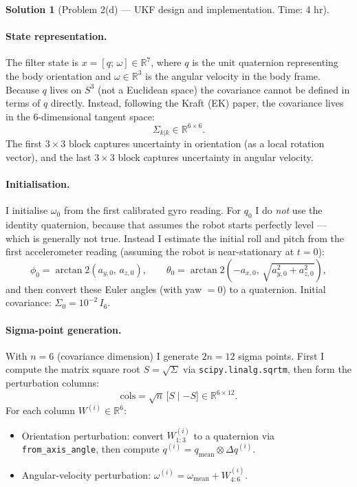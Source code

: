 \documentclass[11pt, reqno, letterpaper]{amsart}
\theoremstyle{plain}
\theoremstyle{definition}
\newtheorem{solution}[theorem]{Solution}
\begin{document}
\clearpage
\begin{solution}[Problem 2(d) — UKF design and implementation. Time: 4 hr]

\paragraph{State representation.}
The filter state is $x=[q;\,\omega]\in\mathbb{R}^7$, where $q$ is the
unit quaternion representing the body orientation and
$\omega\in\mathbb{R}^3$ is the angular velocity in the body frame.
Because $q$ lives on $S^3$ (not a Euclidean space) the covariance cannot
be defined in terms of $q$ directly.  Instead, following the Kraft (EK)
paper, the covariance lives in the $6$-dimensional tangent space:
\[
  \Sigma_{k|k} \in \mathbb{R}^{6\times6}.
\]
The first $3\times3$ block captures uncertainty in orientation
(as a local rotation vector), and the last $3\times3$ block captures
uncertainty in angular velocity.

\paragraph{Initialisation.}
I initialise $\omega_0$ from the first calibrated gyro reading.
For $q_0$ I do \emph{not} use the identity quaternion, because that assumes
the robot starts perfectly level — which is generally not true.
Instead I estimate the initial roll and pitch from the first accelerometer
reading (assuming the robot is near-stationary at $t=0$):
\[
  \phi_0 = \arctan2(a_{y,0},\,a_{z,0}), \qquad
  \theta_0 = \arctan2(-a_{x,0},\,\sqrt{a_{y,0}^2+a_{z,0}^2}),
\]
and then convert these Euler angles (with yaw $=0$) to a quaternion.
Initial covariance: $\Sigma_0 = 10^{-2}\,I_6$.

\paragraph{Sigma-point generation.}
With $n=6$ (covariance dimension) I generate $2n=12$ sigma points.
First I compute the matrix square root $S=\sqrt{\Sigma}$ via
\texttt{scipy.linalg.sqrtm}, then form the perturbation columns:
\[
  \text{cols} = \sqrt{n}\,\bigl[S\;\big|\;{-S}\bigr] \in \mathbb{R}^{6\times12}.
\]
For each column $W^{(i)}\in\mathbb{R}^6$:
\begin{itemize}
  \item Orientation perturbation: convert $W^{(i)}_{1:3}$ to a quaternion
    via \texttt{from\_axis\_angle}, then compute
    $q^{(i)} = q_\text{mean} \otimes \Delta q^{(i)}$.
  \item Angular-velocity perturbation: $\omega^{(i)} = \omega_\text{mean} + W^{(i)}_{4:6}$.
\end{itemize}


\end{solution}
\end{document}
